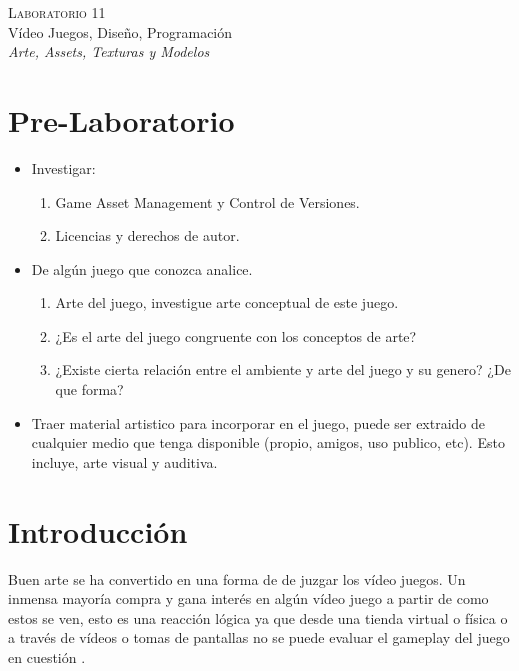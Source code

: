 \begin{center}
\textsc{\Large Laboratorio 11}~\\
{\large Vídeo Juegos, Diseño, Programación}~\\
\emph{Arte, Assets, Texturas y Modelos}
\end{center}

\section{Pre-Laboratorio}
\begin{itemize}
\item Investigar:
\begin{enumerate}
  \item Game Asset Management y Control de Versiones.
  \item Licencias y derechos de autor.
\end{enumerate}
\item De algún juego que conozca analice.
\begin{enumerate}
  \item Arte del juego, investigue arte conceptual de este juego.
  \item ¿Es el arte del juego congruente con los conceptos de arte?
  \item ¿Existe cierta relación entre el ambiente y arte del juego y su genero? ¿De que forma?
\end{enumerate}
\item Traer material artistico para incorporar en el juego, puede ser extraido de cualquier medio que tenga disponible (propio, amigos, uso publico, etc). Esto incluye, arte visual y auditiva.
\end{itemize}

\setlength\intextsep{0pt}
\section{Introducción}
Buen arte se ha convertido en una forma de de juzgar los vídeo juegos. Un inmensa mayoría compra y gana interés en algún vídeo juego a partir de como estos se ven, esto es una reacción lógica ya que desde una tienda virtual o física o a través de vídeos o tomas de pantallas no se puede evaluar el gameplay del juego en cuestión \cite[p.~171]{bobbatesgamedesign}.

